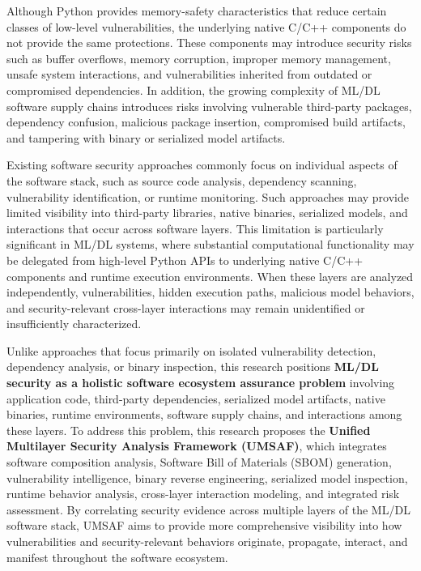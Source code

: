 \documentclass[
  12pt,
  letterpaper,
  oneside]{report}
\begin{document}
Although Python provides memory-safety characteristics that reduce
certain classes of low-level vulnerabilities, the underlying native
C/C++ components do not provide the same protections. These components
may introduce security risks such as buffer overflows, memory
corruption, improper memory management, unsafe system interactions, and
vulnerabilities inherited from outdated or compromised dependencies. In
addition, the growing complexity of ML/DL software supply chains
introduces risks involving vulnerable third-party packages, dependency
confusion, malicious package insertion, compromised build artifacts, and
tampering with binary or serialized model artifacts.

Existing software security approaches commonly focus on individual
aspects of the software stack, such as source code analysis, dependency
scanning, vulnerability identification, or runtime monitoring. Such
approaches may provide limited visibility into third-party libraries,
native binaries, serialized models, and interactions that occur across
software layers. This limitation is particularly significant in ML/DL
systems, where substantial computational functionality may be delegated
from high-level Python APIs to underlying native C/C++ components and
runtime execution environments. When these layers are analyzed
independently, vulnerabilities, hidden execution paths, malicious model
behaviors, and security-relevant cross-layer interactions may remain
unidentified or insufficiently characterized.

Unlike approaches that focus primarily on isolated vulnerability
detection, dependency analysis, or binary inspection, this research
positions \textbf{ML/DL security as a holistic software ecosystem
assurance problem} involving application code, third-party dependencies,
serialized model artifacts, native binaries, runtime environments,
software supply chains, and interactions among these layers. To address
this problem, this research proposes the \textbf{Unified Multilayer
Security Analysis Framework (UMSAF)}, which integrates software
composition analysis, Software Bill of Materials (SBOM) generation,
vulnerability intelligence, binary reverse engineering, serialized model
inspection, runtime behavior analysis, cross-layer interaction modeling,
and integrated risk assessment. By correlating security evidence across
multiple layers of the ML/DL software stack, UMSAF aims to provide more
comprehensive visibility into how vulnerabilities and security-relevant
behaviors originate, propagate, interact, and manifest throughout the
software ecosystem.
\end{document}
